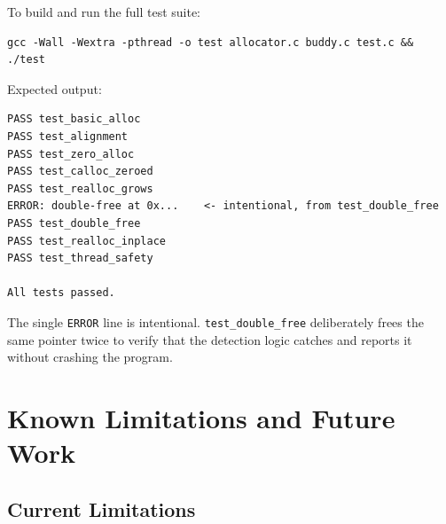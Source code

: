 \documentclass[12pt, a4paper]{report}
\begin{document}
\vspace{1em}
To build and run the full test suite:

\begin{lstlisting}[style=shellstyle, numbers=none]
gcc -Wall -Wextra -pthread -o test allocator.c buddy.c test.c && ./test
\end{lstlisting}

Expected output:

\begin{lstlisting}[style=shellstyle, numbers=none]
PASS test_basic_alloc
PASS test_alignment
PASS test_zero_alloc
PASS test_calloc_zeroed
PASS test_realloc_grows
ERROR: double-free at 0x...    <- intentional, from test_double_free
PASS test_double_free
PASS test_realloc_inplace
PASS test_thread_safety

All tests passed.
\end{lstlisting}

The single \texttt{ERROR} line is intentional. \texttt{test\_double\_free}
deliberately frees the same pointer twice to verify that the detection logic
catches and reports it without crashing the program.

\chapter{Known Limitations and Future Work}

\section{Current Limitations}
\end{document}
